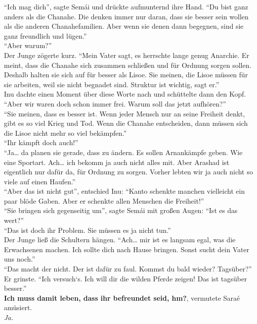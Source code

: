 ``Ich mag dich'', sagte Semái und drückte aufmunternd ihre Hand. ``Du bist ganz anders als die 
Chanahe. Die denken immer nur daran, dass sie besser sein wollen als die anderen Chanahefamilien. 
Aber wenn sie denen dann begegnen, sind sie ganz freundlich und lügen.''\\
``Aber warum?''\\
Der Junge zögerte kurz. ``Mein Vater sagt, es herrschte lange genug Anarchie. Er meint, dass die 
Chanahe sich zusammen schließen und für Ordnung sorgen sollen. Deshalb halten sie sich auf für 
besser als Lisoe. Sie meinen, die Lisoe müssen für sie arbeiten, weil sie nicht begnadet sind. 
Struktur ist wichtig, sagt er.''\\
Inu dachte einen Moment über diese Worte nach und schüttelte dann den Kopf. ``Aber wir waren doch 
schon immer frei. Warum soll das jetzt aufhören?''\\
``Sie meinen, dass es besser ist. Wenn jeder Mensch nur an seine Freiheit denkt, gibt es so viel 
Krieg und Tod. Wenn die Chanahe entscheiden, dann müssen sich die Lisoe nicht mehr so viel 
bekämpfen.''\\
``Ihr kämpft doch auch!''\\
``Ja… da planen sie gerade, dass zu ändern. Es sollen Arnankämpfe geben. Wie eine Sportart. Ach… 
ich  bekomm ja auch nicht alles mit. Aber Arashad ist eigentlich nur dafür da, für Ordnung zu 
sorgen. Vorher lebten wir ja auch nicht so viele auf einen Haufen.''\\
``Aber das ist nicht gut'', entschied Inu: ``Kanto schenkte manchen vielleicht ein paar blöde 
Gaben. Aber er schenkte allen Menschen die Freiheit!''\\
``Sie bringen sich gegenseitig um'', sagte Semái mit großen Augen: ``Ist es das wert?''\\
``Das ist doch ihr Problem. Sie müssen es ja nicht tun.''\\
Der Junge ließ die Schultern hängen. ``Ach… mir ist es langsam egal, was die Erwachsenen machen. 
Ich sollte dich nach Hause bringen. Sonst sucht dein Vater uns noch.''\\
``Das macht der nicht. Der ist dafür zu faul. Kommst du bald wieder? Tagsüber?''\\
Er grinste. ``Ich versuch‘s. Ich will dir die wilden Pferde zeigen! Das ist tagsüber besser.''\\
\textbf{Ich muss damit leben, dass ihr befreundet seid, hm?}, vermutete Saraé amüsiert.\\
\textit{Ja.}\\